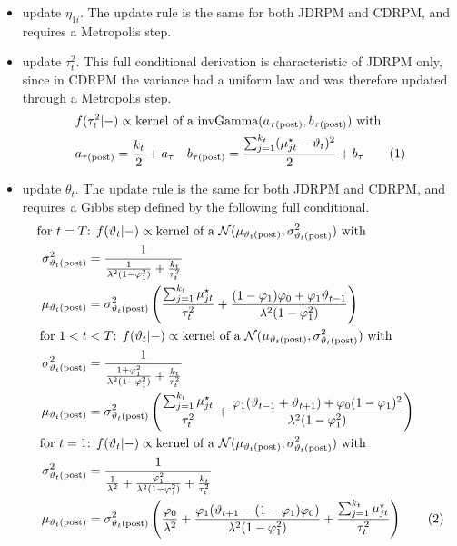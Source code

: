 \documentclass[12pt,	%
	a4paper,		%
	twoside,		%
	openright,		%
	titlepage,%
	]{book}
\newcommand\numberthis{\addtocounter{equation}{1}\tag{\theequation}}
\theoremstyle{definition}
\begin{document}
\begin{itemize}
\item update $\eta_{1i}$. The update rule is the same for both JDRPM and CDRPM, and requires a Metropolis step.

\item update $\tau^2_t$. This full conditional derivation is characteristic of JDRPM only, since in CDRPM the variance had a uniform law and was therefore updated through a Metropolis step. 
\begin{align*}
&f(\tau^2_t|-)\propto \text{kernel of a $\invgamma(a_{\postp{\tau}}, b_{\postp{\tau}})$ with}\\
&a_{\postp{\tau}}=\frac{k_t}{2}+a_\tau \quad
%
b_{\postp{\tau}}= \frac{\sum_{j=1}^{k_t}(\mu_{jt}^\star-\theta_t)^2}{2}+b_\tau
 \numberthis \label{update tau2t}
\end{align*}
    

\item update $\theta_t$. The update rule is the same for both JDRPM and CDRPM, and requires a Gibbs step defined by the following full conditional.
\begin{align*}
    \text{for }t=T &\text{: }
     f(\theta_t|-)\propto \text{kernel of a $\N(\mu_{\postp{\theta_t}},\sigma^2_{\postp{\theta_t}})$ with}\\
    \sigma^2_{\postp{\theta_t}}&=\dfrac{1}{\frac{1}{\lambda^2(1-\phi_1^2)}+\frac{k_t}{\tau_t^2}}\\
    \mu_{\postp{\theta_t}}&=\sigma^2_{\postp{\theta_t}}\left(\frac{\sum_{j=1}^{k_t}\mu^\star_{jt}}{\tau^2_t} + \frac{(1-\phi_1)\phi_0+\phi_1\theta_{t-1}}{\lambda^2(1-\phi_1^2)} \right)\\
\text{for } 1<t&<T \text{: }
     f(\theta_t|-)\propto \text{kernel of a $\N(\mu_{\postp{\theta_t}},\sigma^2_{\postp{\theta_t}})$ with}\\
    \sigma^2_{\postp{\theta_t}}&=\dfrac{1}{\frac{1+\phi_1^2}{\lambda^2(1-\phi_1^2)}+\frac{k_t}{\tau^2_t}}\\
    \mu_{\postp{\theta_t}}&=\sigma^2_{\postp{\theta_t}}\left(\frac{\sum_{j=1}^{k_t}\mu^\star_{jt}}{\tau^2_t} + \frac{\phi_1(\theta_{t-1}+\theta_{t+1}) + \phi_0(1-\phi_1)^2}{\lambda^2(1-\phi_1^2)} \right)\\
    \text{for }t=1 &\text{: }
     f(\theta_t|-)\propto \text{kernel of a $\N(\mu_{\postp{\theta_t}},\sigma^2_{\postp{\theta_t}})$ with}\\
    \sigma^2_{\postp{\theta_t}}&=\dfrac{1}{\frac{1}{\lambda^2}+\frac{\phi_1^2}{\lambda^2(1-\phi_1^2)}+\frac{k_t}{\tau^2_t}}\\
\mu_{\postp{\theta_t}}&=\sigma^2_{\postp{\theta_t}}\left(\frac{\phi_0}{\lambda^2}+\frac{\phi_1(\theta_{t+1}-(1-\phi_1)\phi_0)}{\lambda^2(1-\phi_1^2)}+\frac{\sum_{j=1}^{k_t}\mu^\star_{jt}}{\tau^2_t} \right)
 \numberthis \label{update thetat}
\end{align*}



\end{itemize}
\end{document}
